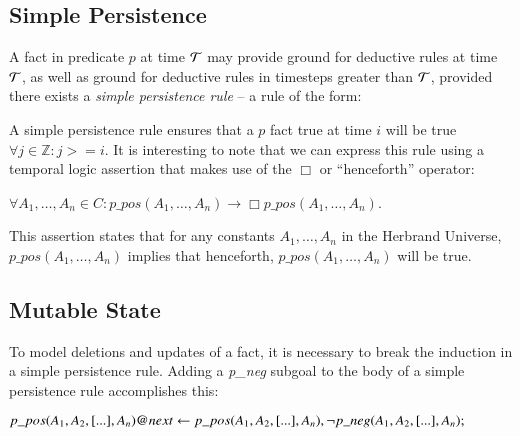 \subsection{Simple Persistence}

A fact in predicate $p$ at time $\Tau$ may provide ground for deductive rules
at time $\Tau$, as well as ground for deductive rules in timesteps greater than $\Tau$,
provided there exists a {\em simple persistence rule} -- a rule of the form:




A simple persistence rule ensures that a $p$ fact true at time $i$ will be true
$\forall j \in \mathbb{Z} : j >= i$.  It is interesting to note that we can
express this rule using a temporal logic assertion that makes use of the $\Box$
or ``henceforth'' operator:

$\forall A_1, \ldots, A_n \in C : p\_pos(A_1, \ldots, A_n) \to \Box p\_pos(A_1,
\ldots, A_n)$.

This assertion states that for any constants $A_1, \ldots, A_n$ in the Herbrand
Universe, $p\_pos(A_1, \ldots, A_n)$ implies that henceforth, \linebreak
$p\_pos(A_1, \ldots, A_n)$ will be true.

\subsection{Mutable State}

To model deletions and updates of a fact, it is necessary to break the induction
in a simple persistence rule.  Adding a {\em p\_neg} subgoal to the body of a
simple persistence rule accomplishes this:

$p\_pos(A_1,A_2,[...],A_n)@next \leftarrow \\
p\_pos(A_1,A_2,[...],A_n), \\
\lnot p\_neg(A_1,A_2,[...],A_n);
$

